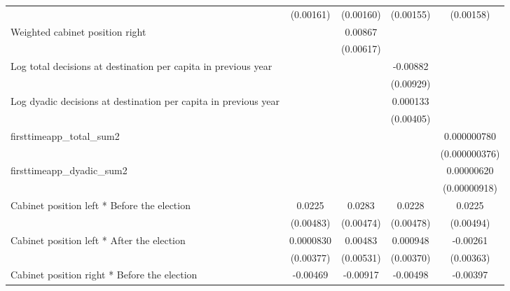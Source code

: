 \begin{table}[htbp]
\begin{tabular}{l*{4}{c}}
                    &   (0.00161)         &   (0.00160)         &   (0.00155)         &   (0.00158)         \\
[1em]
Weighted cabinet position right&                     &     0.00867         &                     &                     \\
                    &                     &   (0.00617)         &                     &                     \\
[1em]
Log total decisions at destination per capita in previous year&                     &                     &    -0.00882         &                     \\
                    &                     &                     &   (0.00929)         &                     \\
[1em]
Log dyadic decisions at destination per capita in previous year&                     &                     &    0.000133         &                     \\
                    &                     &                     &   (0.00405)         &                     \\
[1em]
firsttimeapp\_total\_sum2&                     &                     &                     & 0.000000780\sym{*}  \\
                    &                     &                     &                     &(0.000000376)         \\
[1em]
firsttimeapp\_dyadic\_sum2&                     &                     &                     &  0.00000620         \\
                    &                     &                     &                     &(0.00000918)         \\
[1em]
Cabinet position left * Before the election&      0.0225\sym{***}&      0.0283\sym{***}&      0.0228\sym{***}&      0.0225\sym{***}\\
                    &   (0.00483)         &   (0.00474)         &   (0.00478)         &   (0.00494)         \\
[1em]
Cabinet position left * After the election&   0.0000830         &     0.00483         &    0.000948         &    -0.00261         \\
                    &   (0.00377)         &   (0.00531)         &   (0.00370)         &   (0.00363)         \\
[1em]
Cabinet position right * Before the election&    -0.00469         &    -0.00917\sym{*}  &    -0.00498         &    -0.00397         \\

\end{tabular}
\end{table}
